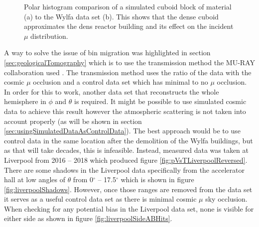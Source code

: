 \begin{figure}[!h]
\begin{subfigure}{.5\textwidth}
  \captionsetup{width=.9\linewidth}
  \caption{}
  \label{subFig:measuredWylfaAttenuation}
\end{subfigure}
\caption{Polar histogram comparison of a simulated cuboid block of material (a) to the Wylfa data set (b). This shows that the dense cuboid approximates the dens reactor building and its effect on the incident $\mu$ distribution.}
\label{fig:sideBySideComparisonTopDownCirc}
\end{figure}

A way to solve the issue of bin migration was highlighted in section \ref{sec:geologicalTomography} which is to use the transmission method the MU-RAY collaboration used \cite{Ambrosino_2014}. The transmission method uses the ratio of the data with the cosmic $\mu$ occlusion and a control data set which has minimal to no $\mu$ occlusion. In order for this to work, another data set that reconstructs the whole hemisphere in $\phi$ and $\theta$ is required. It might be possible to use simulated cosmic data to achieve this result however the atmospheric scattering is not taken into account properly (as will be shown in section \ref{sec:usingSimulatedDataAsControlData}). The best approach would be to use control data in the same location after the demolition of the Wylfa buildings, but as that will take decades, this is infeasible. Instead, measured data was taken at Liverpool from 2016 -- 2018 which produced figure \ref{fig:pVsTLiverpoolReversed}. There are some shadows in the Liverpool data specifically from the accelerator hall at low angles of $\theta$ from 0$^\circ$ -- 17.5$^\circ$ which is shown in figure \ref{fig:liverpoolShadows}. However, once those ranges are removed from the data set it serves as a useful control data set as there is minimal cosmic $\mu$ sky occlusion. When checking for any potential bias in the Liverpool data set, none is visible for either side as shown in figure \ref{fig:liverpoolSideABHits}. 

